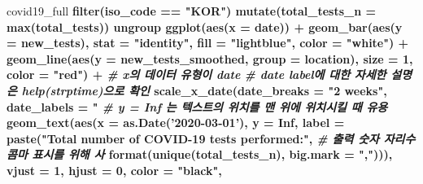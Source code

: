 \documentclass[
  11pt,
]{krantz}
\newenvironment{Shaded}{\begin{snugshade}}{\end{snugshade}}
\newcommand{\CommentTok}[1]{\textcolor[rgb]{0.37,0.37,0.37}{\textit{#1}}}
\newcommand{\DataTypeTok}[1]{\textcolor[rgb]{0.27,0.27,0.27}{#1}}
\newcommand{\DecValTok}[1]{\textcolor[rgb]{0.06,0.06,0.06}{#1}}
\newcommand{\KeywordTok}[1]{\textcolor[rgb]{0.27,0.27,0.27}{\textbf{#1}}}
\newcommand{\NormalTok}[1]{#1}
\newcommand{\OperatorTok}[1]{\textcolor[rgb]{0.43,0.43,0.43}{\textbf{#1}}}
\newcommand{\OtherTok}[1]{\textcolor[rgb]{0.37,0.37,0.37}{#1}}
\newcommand{\StringTok}[1]{\textcolor[rgb]{0.5,0.5,0.5}{#1}}
\begin{document}
\begin{Shaded}
\begin{Highlighting}[]
\NormalTok{covid19_full }\OperatorTok{%
\StringTok{  }\KeywordTok{filter}\NormalTok{(iso_code }\OperatorTok{==}\StringTok{ "KOR"}\NormalTok{) }\OperatorTok{%
\StringTok{  }\KeywordTok{mutate}\NormalTok{(}\DataTypeTok{total_tests_n =} \KeywordTok{max}\NormalTok{(total_tests)) }\OperatorTok{%
\StringTok{  }\NormalTok{ungroup }\OperatorTok{%
\StringTok{  }\KeywordTok{ggplot}\NormalTok{(}\KeywordTok{aes}\NormalTok{(}\DataTypeTok{x =}\NormalTok{ date)) }\OperatorTok{+}\StringTok{ }
\StringTok{  }\KeywordTok{geom_bar}\NormalTok{(}\KeywordTok{aes}\NormalTok{(}\DataTypeTok{y =}\NormalTok{ new_tests), }
           \DataTypeTok{stat =} \StringTok{"identity"}\NormalTok{, }
           \DataTypeTok{fill =} \StringTok{"lightblue"}\NormalTok{, }
           \DataTypeTok{color =} \StringTok{"white"}\NormalTok{) }\OperatorTok{+}\StringTok{ }
\StringTok{  }\KeywordTok{geom_line}\NormalTok{(}\KeywordTok{aes}\NormalTok{(}\DataTypeTok{y =}\NormalTok{ new_tests_smoothed, }
                \DataTypeTok{group =}\NormalTok{ location), }
            \DataTypeTok{size =} \DecValTok{1}\NormalTok{, }
            \DataTypeTok{color =} \StringTok{"red"}\NormalTok{) }\OperatorTok{+}\StringTok{ }
\StringTok{  }\CommentTok{# x의 데이터 유형이 date}
\StringTok{  }\CommentTok{# date label에 대한 자세한 설명은 help(strptime)으로 확인}
\StringTok{  }\KeywordTok{scale_x_date}\NormalTok{(}\DataTypeTok{date_breaks =} \StringTok{"2 weeks"}\NormalTok{, }
               \DataTypeTok{date_labels =} \StringTok{"%
\StringTok{  }\CommentTok{# y = Inf 는 텍스트의 위치를 맨 위에 위치시킬 때 유용}
\StringTok{  }\KeywordTok{geom_text}\NormalTok{(}\KeywordTok{aes}\NormalTok{(}\DataTypeTok{x =} \KeywordTok{as.Date}\NormalTok{(}\StringTok{'2020-03-01'}\NormalTok{), }\DataTypeTok{y =} \OtherTok{Inf}\NormalTok{, }
                \DataTypeTok{label =} \KeywordTok{paste}\NormalTok{(}\StringTok{"Total number of COVID-19 tests performed:"}\NormalTok{, }
                              \CommentTok{# 출력 숫자 자리수 콤마 표시를 위해 사}
                              \KeywordTok{format}\NormalTok{(}\KeywordTok{unique}\NormalTok{(total_tests_n), }
                               \DataTypeTok{big.mark =} \StringTok{","}\NormalTok{))), }
            \DataTypeTok{vjust =} \DecValTok{1}\NormalTok{, }
            \DataTypeTok{hjust =} \DecValTok{0}\NormalTok{, }
            \DataTypeTok{color =} \StringTok{"black"}\NormalTok{, }
}}}}}
\end{Highlighting}
\end{Shaded}
\end{document}
